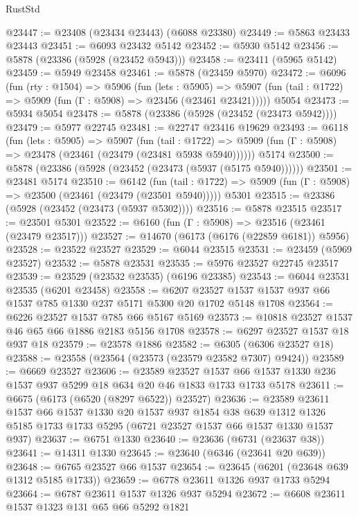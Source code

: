 \begin{lexlean}{RustStd}
\begin{coremodule}
@23447 := @23408 (@23434 @23443) (@6088 @23380)
@23449 := @5863 @23433 @23443
@23451 := @6093 @23432 @5142
@23452 := @5930 @5142
@23456 := @5878 (@23386 (@5928 (@23452 @5943)))
@23458 := @23411 (@5965 @5142)
@23459 := @5949 @23458
@23461 := @5878 (@23459 @5970)
@23472 := @6096
    (fun (rty : @1504) =>
    @5906
      (fun (lets : @5905) =>
      @5907 (fun (tail : @1722) => @5909 (fun (Γ : @5908) => @23456 (@23461 @23421)))))
    @5054
@23473 := @5934 @5054
@23478 := @5878 (@23386 (@5928 (@23452 (@23473 @5942))))
@23479 := @5977 @22745
@23481 := @22747 @23416 @19629
@23493 := @6118
    (fun (lets : @5905) =>
    @5907
      (fun (tail : @1722) =>
      @5909 (fun (Γ : @5908) => @23478 (@23461 (@23479 (@23481 @5938 @5940))))))
    @5174
@23500 := @5878 (@23386 (@5928 (@23452 (@23473 (@5937 (@5175 @5940))))))
@23501 := @23481 @5174
@23510 := @6142
    (fun (tail : @1722) => @5909 (fun (Γ : @5908) => @23500 (@23461 (@23479 (@23501 @5940)))))
    @5301
@23515 := @23386 (@5928 (@23452 (@23473 (@5937 @5302))))
@23516 := @5878 @23515
@23517 := @23501 @5301
@23522 := @6160 (fun (Γ : @5908) => @23516 (@23461 (@23479 @23517)))
@23527 := @14670 (@6173 (@6176 (@22859 @6181)) @5956)
@23528 := @23522 @23527
@23529 := @6044 @23515
@23531 := @23459 (@5969 @23527)
@23532 := @5878 @23531
@23535 := @5976 @23527 @22745 @23517
@23539 := @23529 (@23532 @23535) (@6196 @23385)
@23543 := @6044 @23531 @23535 (@6201 @23458)
@23558 := @6207 @23527 @1537 @1537 @937 @66 @1537 @785 @1330 @237 @5171 @5300 @20 @1702 @5148 @1708
@23564 := @6226 @23527 @1537 @785 @66 @5167 @5169
@23573 := @10818 @23527 @1537 @46 @65 @66 @1886 @2183 @5156 @1708
@23578 := @6297 @23527 @1537 @18 @937 @18
@23579 := @23578 @1886
@23582 := @6305 (@6306 @23527 @18)
@23588 := @23558 (@23564 (@23573 (@23579 @23582 @7307) @9424))
@23589 := @6669 @23527
@23606 := @23589
    @23527
    @1537
    @66
    @1537
    @1330
    @236
    @1537
    @937
    @5299
    @18
    @634
    @20
    @46
    @1833
    @1733
    @1733
    @5178
@23611 := @6675 (@6173 (@6520 (@8297 @6522)) @23527)
@23636 := @23589
    @23611
    @1537
    @66
    @1537
    @1330
    @20
    @1537
    @937
    @1854
    @38
    @639
    @1312
    @1326
    @5185
    @1733
    @1733
    @5295
    (@6721 @23527 @1537 @66 @1537 @1330 @1537 @937)
@23637 := @6751 @1330
@23640 := @23636 (@6731 (@23637 @38))
@23641 := @14311 @1330
@23645 := @23640 (@6346 (@23641 @20 @639))
@23648 := @6765 @23527 @66 @1537
@23654 := @23645 (@6201 (@23648 @639 @1312 @5185 @1733))
@23659 := @6778 @23611 @1326 @937 @1733 @5294
@23664 := @6787 @23611 @1537 @1326 @937 @5294
@23672 := @6608 @23611 @1537 @1323 @131 @65 @66 @5292 @1821

\end{coremodule}
\end{lexlean}
